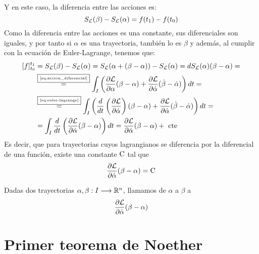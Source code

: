 Y en este caso, la diferencia entre las acciones es:
\begin{equation}
	\label{eq:variacion-accion-relacion}
	S_{\mathcal{L}}(\beta) - S_{\mathcal{L}}(\alpha) = f(t_1) - f(t_0)
\end{equation}
Como la diferencia entre las acciones es una constante, sus diferenciales son iguales, y por tanto si $\alpha$ es una trayectoria, también lo es $\beta$ y además, al cumplir con la ecuación de Euler-Lagrange, tenemos que:
\begin{equation}
	\label{eq:diferencial_trayectoria}
	\begin{split}
	[f]_{t_0}^{t_1} & = S_{\mathcal{L}}(\beta) - S_{\mathcal{L}}(\alpha) = S_{\mathcal{L}}(\alpha + (\beta-\alpha))-S_{\mathcal{L}}(\alpha)=dS_{\mathcal{L}}(\alpha)(\beta-\alpha)=\\
	&\overset{\fbox{\tiny \ref{eq:accion_diferencial}}}{=} \int_{I}\left( \frac{\partial \mathcal{L}}{\partial\alpha}(\beta-\alpha)+\frac{\partial \mathcal{L}}{\partial\dot{\alpha}}(\dot{\beta}-\dot{\alpha})\right) dt = \\
	&\overset{\fbox{\tiny \ref{eq:euler-lagrange}}}{=} \int_{I}\left( \frac{d}{dt}\left(\frac{\partial \mathcal{L}}{\partial\dot{\alpha}}\right)(\beta-\alpha)+\frac{\partial \mathcal{L}}{\partial\dot{\alpha}}(\dot{\beta}-\dot{\alpha})\right) dt=\\
	&= \int_{I}\frac{d}{dt}\left(\frac{\partial \mathcal{L}}{\partial\dot{\alpha}}(\beta-\alpha)\right) dt = \frac{\partial \mathcal{L}}{\partial\dot{\alpha}}(\beta-\alpha) + \text{ cte }
	\end{split}
\end{equation}
Es decir, que para trayectorias cuyos lagrangianos se diferencia por la diferencial de una función, existe una constante $\text{\rmfamily\upshape C}$ tal que
\begin{equation}
	\label{eq:carga_noether_para_trayectorias}
	\frac{\partial \mathcal{L}}{\partial\dot{\alpha}}(\beta-\alpha) = \text{\rmfamily\upshape C}
\end{equation}

\begin{definition}
	Dadas dos trayectorias $\alpha,\beta:I\longrightarrow \mathbb{R}^n$, llamamos  de $\alpha$ a $\beta$ a
	\begin{equation}
		\label{eq:carga_noether}
		\frac{\partial \mathcal{L}}{\partial\dot{\alpha}}(\beta-\alpha)
	\end{equation}
\end{definition}

\section{Primer teorema de Noether}\label{sec:primer-teorema-de-noether}

